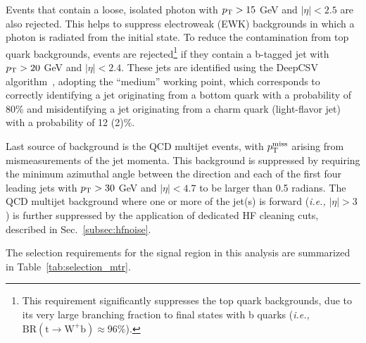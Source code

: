 Events that contain a loose, isolated photon with $p_{\textrm{T}}>15$ GeV and $|\eta| < 2.5$ are also rejected. 
This helps to suppress electroweak (EWK) backgrounds in which a photon is radiated from the initial state.
To reduce the contamination from top quark backgrounds, events are 
rejected\footnote{This requirement significantly suppresses the top quark backgrounds, due to its very large branching fraction
to final states with b quarks (\textit{i.e.,} $\textrm{BR}(\textrm{t} \rightarrow \textrm{W}^{+} \textrm{b}) \approx 96\%$).} 
if they contain a b-tagged jet with $p_{\textrm{T}} > 20$ GeV and $|\eta| < 2.4$. 
These jets are identified using the DeepCSV algorithm~\cite{CMS_NOTE_2018-323,Sirunyan:2017ezt}, 
adopting the ``medium'' working point, which corresponds to correctly identifying a jet originating from a bottom quark with 
a probability of 80\% and misidentifying a jet originating from a charm quark (light-flavor jet) with a probability of 12 (2)\%.

Last source of background is the QCD multijet events, with $p_{\textrm{T}}^{\textrm{miss}}$ arising from mismeasurements of the jet momenta. 
This background is suppressed by requiring the minimum
azimuthal angle between the \ptvecmiss direction and each of the first four leading jets with $p_{\textrm{T}} > 30$ GeV
and $|\eta| < 4.7$ to be larger than 0.5 radians. The QCD multijet background where one or more of the jet(s) is forward (\textit{i.e.,} $|\eta|>3$)
is further suppressed by the application of dedicated HF cleaning cuts, described in Sec.~\ref{subsec:hfnoise}.

The selection requirements for the signal region in this analysis are summarized in Table~\ref{tab:selection_mtr}.

